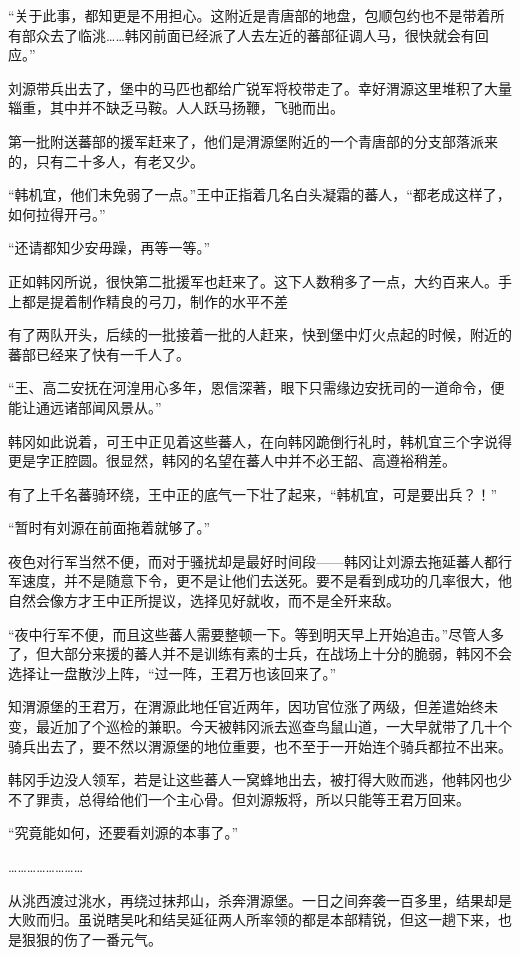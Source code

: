 “关于此事，都知更是不用担心。这附近是青唐部的地盘，包顺包约也不是带着所有部众去了临洮……韩冈前面已经派了人去左近的蕃部征调人马，很快就会有回应。”

刘源带兵出去了，堡中的马匹也都给广锐军将校带走了。幸好渭源这里堆积了大量辎重，其中并不缺乏马鞍。人人跃马扬鞭，飞驰而出。

第一批附送蕃部的援军赶来了，他们是渭源堡附近的一个青唐部的分支部落派来的，只有二十多人，有老又少。

“韩机宜，他们未免弱了一点。”王中正指着几名白头凝霜的蕃人，“都老成这样了，如何拉得开弓。”

“还请都知少安毋躁，再等一等。”

正如韩冈所说，很快第二批援军也赶来了。这下人数稍多了一点，大约百来人。手上都是提着制作精良的弓刀，制作的水平不差

有了两队开头，后续的一批接着一批的人赶来，快到堡中灯火点起的时候，附近的蕃部已经来了快有一千人了。

“王、高二安抚在河湟用心多年，恩信深著，眼下只需缘边安抚司的一道命令，便能让通远诸部闻风景从。”

韩冈如此说着，可王中正见着这些蕃人，在向韩冈跪倒行礼时，韩机宜三个字说得更是字正腔圆。很显然，韩冈的名望在蕃人中并不必王韶、高遵裕稍差。

有了上千名蕃骑环绕，王中正的底气一下壮了起来，“韩机宜，可是要出兵？！”

“暂时有刘源在前面拖着就够了。”

夜色对行军当然不便，而对于骚扰却是最好时间段——韩冈让刘源去拖延蕃人都行军速度，并不是随意下令，更不是让他们去送死。要不是看到成功的几率很大，他自然会像方才王中正所提议，选择见好就收，而不是全歼来敌。

“夜中行军不便，而且这些蕃人需要整顿一下。等到明天早上开始追击。”尽管人多了，但大部分来援的蕃人并不是训练有素的士兵，在战场上十分的脆弱，韩冈不会选择让一盘散沙上阵，“过一阵，王君万也该回来了。”

知渭源堡的王君万，在渭源此地任官近两年，因功官位涨了两级，但差遣始终未变，最近加了个巡检的兼职。今天被韩冈派去巡查鸟鼠山道，一大早就带了几十个骑兵出去了，要不然以渭源堡的地位重要，也不至于一开始连个骑兵都拉不出来。

韩冈手边没人领军，若是让这些蕃人一窝蜂地出去，被打得大败而逃，他韩冈也少不了罪责，总得给他们一个主心骨。但刘源叛将，所以只能等王君万回来。

“究竟能如何，还要看刘源的本事了。”

……………………

从洮西渡过洮水，再绕过抹邦山，杀奔渭源堡。一日之间奔袭一百多里，结果却是大败而归。虽说瞎吴叱和结吴延征两人所率领的都是本部精锐，但这一趟下来，也是狠狠的伤了一番元气。

